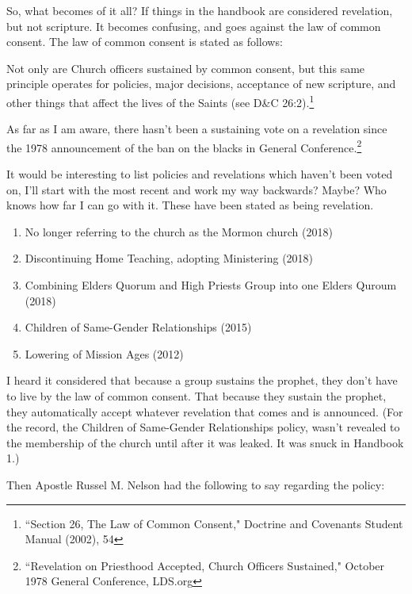 So, what becomes of it all? If things in the handbook are considered revelation, but
not scripture. It becomes confusing, and goes against the law of common consent. The
law of common consent is stated as follows:

\begin{displayquote}
Not only are Church officers sustained by common consent, but this same principle 
operates for policies, major decisions, acceptance of new scripture, and other things 
that affect the lives of the Saints (see D\&C 26:2).\footnote{``Section 26, The Law 
of Common Consent," Doctrine and Covenants Student Manual (2002), 54}
\end{displayquote}

As far as I am aware, there hasn't been a sustaining vote on a revelation since the
1978 announcement of the ban on the blacks in General Conference.\footnote{
``Revelation on Priesthood Accepted, Church Officers Sustained," October 1978 General
Conference, LDS.org
}

It would be interesting to list policies and revelations which haven't been voted on,
I'll start with the most recent and work my way backwards? Maybe? Who knows how far I
can go with it. These have been stated as being revelation.

\begin{enumerate}
\item No longer referring to the church as the Mormon church (2018)
\item Discontinuing Home Teaching, adopting Ministering (2018)
\item Combining Elders Quorum and High Priests Group into one Elders Quroum (2018)
\item Children of Same-Gender Relationships (2015)
\item Lowering of Mission Ages (2012)
\end{enumerate}

I heard it considered that because a group sustains the prophet, they don't have to
live by the law of common consent. That because they sustain the prophet, they
automatically accept whatever revelation that comes and is announced. (For the
  record, the Children of Same-Gender Relationships policy, wasn't revealed to
  the membership of the church until after it was leaked. It was snuck in Handbook
  1.)

Then Apostle Russel M. Nelson had the following to say regarding the policy:

